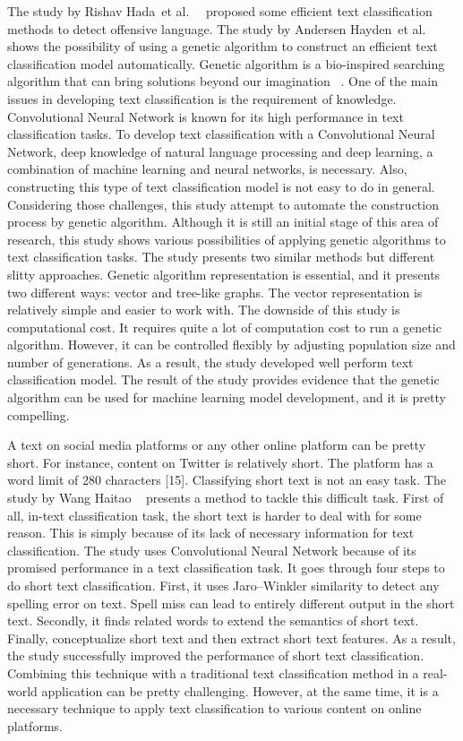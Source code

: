 \documentclass[11pt, natbib=false]{article}
\begin{document}
\begin{multicols}{2}
The study by Rishav Hada et al. ~\cite{hada2021ruddit} proposed some efficient text classification methods to detect offensive language.
The study by Andersen Hayden et al. ~\cite{andersen2021evolving} shows the possibility of using a genetic algorithm to construct an efficient text classification model automatically.
Genetic algorithm is a bio-inspired searching algorithm that can bring solutions beyond our imagination ~\cite{lehman2020surprising}.
One of the main issues in developing text classification is the requirement of knowledge.
Convolutional Neural Network is known for its high performance in text classification tasks. To develop text classification with a Convolutional Neural Network, deep knowledge of natural language processing and deep learning, a combination of machine learning and neural networks, is necessary.
Also, constructing this type of text classification model is not easy to do in general. Considering those challenges, this study attempt to automate the construction process by genetic algorithm.
Although it is still an initial stage of this area of research, this study shows various possibilities of applying genetic algorithms to text classification tasks.
The study presents two similar methods but different slitty approaches. Genetic algorithm representation is essential, and it presents two different ways: vector and tree-like graphs.
The vector representation is relatively simple and easier to work with.
The downside of this study is computational cost.
It requires quite a lot of computation cost to run a genetic algorithm.
However, it can be controlled flexibly by adjusting population size and number of generations.
As a result, the study developed well perform text classification model.
The result of the study provides evidence that the genetic algorithm can be used for machine learning model development, and it is pretty compelling. 

A text on social media platforms or any other online platform can be pretty short. For instance, content on Twitter is relatively short. The platform has a word limit of 280 characters [15].
Classifying short text is not an easy task.
The study by Wang Haitao ~\cite{wang2021short} presents a method to tackle this difficult task.
First of all, in-text classification task, the short text is harder to deal with for some reason. This is simply because of its lack of necessary information for text classification.
The study uses Convolutional Neural Network because of its promised performance in a text classification task. It goes through four steps to do short text classification.
First, it uses Jaro–Winkler similarity to detect any spelling error on text. Spell miss can lead to entirely different output in the short text.
Secondly, it finds related words to extend the semantics of short text. Finally, conceptualize short text and then extract short text features.
As a result, the study successfully improved the performance of short text classification.
Combining this technique with a traditional text classification method in a real-world application can be pretty challenging.
However, at the same time, it is a necessary technique to apply text classification to various content on online platforms. 


\end{multicols}
\end{document}
